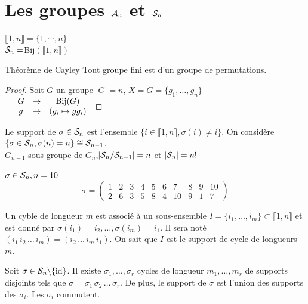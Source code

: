 \documentclass[]{report}
\begin{document}
    \section{Les groupes $\mathcal{A}_n$ et $\mathcal{S}_n$}

    \begin{nt}{}{}
        $\llbracket 1,n\rrbracket=\{1,\cdots,n\}$\\
        $\mathcal{S}_n=$Bij$(\llbracket1,n\rrbracket)$
    \end{nt}

    \begin{tm}{Théorème de Cayley}{}
        Tout groupe fini est \sg d'un groupe de permutations.
    \end{tm}

    \begin{proof}
        Soit $G$ un groupe \tq $|G|=n$, $X=G=\{g_1,\ldots,g_n\}$\\
        $\begin{array}{ccccc} & G & \to & \text{Bij}(G) \\ & g & \mapsto & (g_i\mapsto gg_i) \end{array}$
    \end{proof}

    \begin{dfprop}
        Le support de $\sigma\in\mathcal{S}_n$ est l'ensemble $\{i\in\llbracket 1,n\rrbracket,\sigma(i)\neq i\}$. On considère $\{\sigma\in\mathcal{S}_n,\sigma(n)=n\}\cong\mathcal{S}_{n-1}$.\\
        $G_{n-1}$ sous groupe de $G_n$,$|\mathcal{S}_n/\mathcal{S}_{n-1}|=n$ et $|\mathcal{S}_n|=n!$
    \end{dfprop}

    \begin{ex}{}{}
        $\sigma \in\mathcal{S}_n,n=10$
        \[\sigma=\left(\begin{matrix}
            1&2&3&4&5&6&7&8&9&10\\
            2&6&3&5&8&4&10&9&1&7
        \end{matrix}\right)\]
    \end{ex}

    \begin{df}{}{}
        Un cyble de longueur $m$ est associé à un sous-ensemble $I=\{i_1,\ldots,i_m\}\subset \llbracket 1,n\rrbracket$ et est donné par $\sigma(i_1)=i_2,\ldots,\sigma(i_m)=i_1$. Il sera noté $(i_1\, i_2\,\ldots\, i_m)=(i_2\,\ldots\, i_m\, i_1)$. On sait que $I$ est le support de cycle de longueurs $m$.
    \end{df}

    \begin{tm}{}{}
        Soit $\sigma\in\mathcal{S}_n\backslash\{\text{id}\}$. Il existe $\sigma_1,\ldots,\sigma_r$ cycles de longueur $m_1,\ldots,m_r$ de supports disjoints tels que $\sigma=\sigma_1\,\sigma_2\,\ldots\,\sigma_r$. De plus, le support de $\sigma$ est l'union des supports des $\sigma_i$. Les $\sigma_i$ commutent.
    \end{tm}
\end{document}
